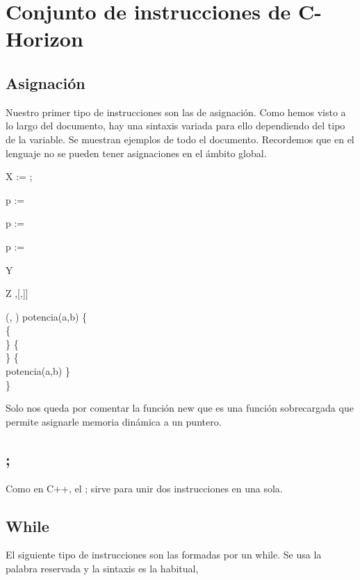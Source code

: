 \chapter{Conjunto de instrucciones de C-Horizon}
\label{cap:instrucciones}



\section{Asignación}
Nuestro primer tipo de instrucciones son las de asignación. Como hemos visto a lo largo del documento, hay una sintaxis variada para ello dependiendo del tipo de la variable. Se muestran ejemplos de todo el documento. Recordemos que en el lenguaje no se pueden tener asignaciones en el \'{a}mbito global.

\begin{algorithm}

	\Integer{} X  := ;
	
	\Integer{\operator{*}} p  := \;
	
	p :=  \;
	
	\operator{*}p := 
	
	\Boolean{[\const{3}]} Y  \;
	
	\Integer{[\const{2}][\const{2}]} Z \Assign 
	[[\const{0},\const{1}],[,]] \;
	
	\Integer{}(\Integer{}, \Integer{}) potencia(a,b) \{ \\
	\quad {} \{\\
	\quad \quad {} \;
	\quad \}  \{\\
	\quad \quad {} \;
	\quad \} \Elsee \{\\
	\quad \quad {} potencia(a,b\operator{-})\;
	\quad \} \\
	\}\;
	
	
\end{algorithm}

Solo nos queda por comentar la función new que es una función sobrecargada que permite asignarle memoria dinámica a un puntero.
\section{;}
Como en C++, el ; sirve para unir dos instrucciones en una sola.

\section{While}
El siguiente tipo de instrucciones son las formadas por un while. Se usa la palabra reservada  y la sintaxis es la habitual,

